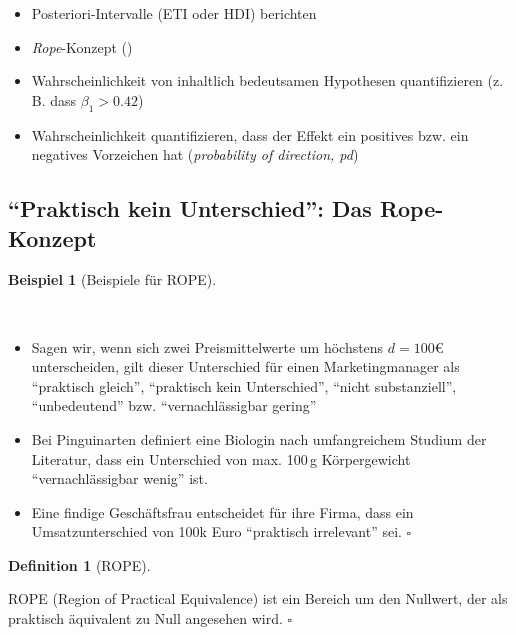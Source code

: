\documentclass[
  ngerman,
  letterpaper,
  twoside,
  open=any]{scrbook}
\providecommand{\tightlist}{%
  \setlength{\itemsep}{0pt}\setlength{\parskip}{0pt}}\usepackage{longtable,booktabs,array}
\theoremstyle{definition}
\newtheorem{example}{Beispiel}[chapter]
\theoremstyle{plain}
\theoremstyle{definition}
\theoremstyle{definition}
\newtheorem{definition}{Definition}[chapter]
\theoremstyle{definition}
\newtheorem{example}{Beispiel}[chapter]
\theoremstyle{definition}
\theoremstyle{remark}
\begin{document}
\begin{itemize}
\tightlist
\item
  Posteriori-Intervalle (ETI oder HDI) berichten
\item
  \emph{Rope}-Konzept ()
\item
  Wahrscheinlichkeit von inhaltlich bedeutsamen Hypothesen
  quantifizieren (z.\,B. dass \(\beta_1 > 0.42\))
\item
  Wahrscheinlichkeit quantifizieren, dass der Effekt ein positives bzw.
  ein negatives Vorzeichen hat (\emph{probability of direction, pd})
\end{itemize}

\subsection{\texorpdfstring{\enquote{Praktisch kein Unterschied}: Das
Rope-Konzept}{``Praktisch kein Unterschied'': Das Rope-Konzept}}\label{praktisch-kein-unterschied-das-rope-konzept}

\begin{example}[Beispiele für
ROPE]\protect\hypertarget{exm-rope}{}\label{exm-rope}

~

\begin{itemize}
\item
  Sagen wir, wenn sich zwei Preismittelwerte um höchstens \(d=100\)€
  unterscheiden, gilt dieser Unterschied für einen Marketingmanager als
  \enquote{praktisch gleich}, \enquote{praktisch kein Unterschied},
  \enquote{nicht substanziell}, \enquote{unbedeutend} bzw.
  \enquote{vernachlässigbar gering}
\item
  Bei Pinguinarten definiert eine Biologin nach umfangreichem Studium
  der Literatur, dass ein Unterschied von max. 100\,g Körpergewicht
  \enquote{vernachlässigbar wenig} ist.
\item
  Eine findige Geschäftsfrau entscheidet für ihre Firma, dass ein
  Umsatzunterschied von 100k Euro \enquote{praktisch irrelevant} sei.
  \(\square\)
\end{itemize}

\end{example}

\begin{definition}[ROPE]\protect\hypertarget{def-rope}{}\label{def-rope}

ROPE (Region of Practical Equivalence) ist ein Bereich um den Nullwert,
der als praktisch äquivalent zu Null angesehen wird. \(\square\)

\end{definition}
\end{document}
